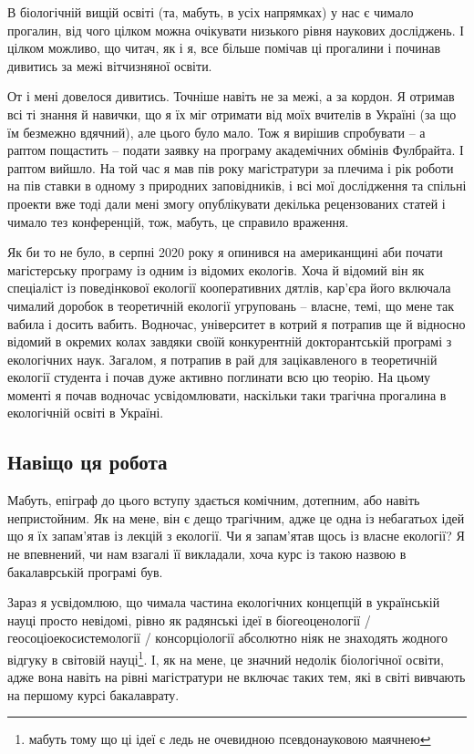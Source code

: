 \documentclass[
  11pt,
]{book}
\begin{document}
В біологічній вищій освіті (та, мабуть, в усіх напрямках) у нас є чимало прогалин, від чого цілком можна очікувати низького рівня наукових досліджень. І цілком можливо, що читач, як і я, все більше помічав ці прогалини і починав дивитись за межі вітчизняної освіти.

От і мені довелося дивитись. Точніше навіть не за межі, а за кордон. Я отримав всі ті знання й навички, що я їх міг отримати від моїх вчителів в Україні (за що їм безмежно вдячний), але цього було мало. Тож я вирішив спробувати -- а раптом пощастить -- подати заявку на програму академічних обмінів Фулбрайта. І раптом вийшло. На той час я мав пів року магістратури за плечима і рік роботи на пів ставки в одному з природних заповідників, і всі мої дослідження та спільні проекти вже тоді дали мені змогу опублікувати декілька рецензованих статей і чимало тез конференцій, тож, мабуть, це справило враження.

Як би то не було, в серпні 2020 року я опинився на американщині аби почати магістерську програму із одним із відомих екологів. Хоча й відомий він як спеціаліст із поведінкової екології кооперативних дятлів, кар'єра його включала чималий доробок в теоретичній екології угруповань -- власне, темі, що мене так вабила і досить вабить. Водночас, університет в котрий я потрапив ще й відносно відомий в окремих колах завдяки своїй конкурентній докторантській програмі з екологічних наук. Загалом, я потрапив в рай для зацікавленого в теоретичній екології студента і почав дуже активно поглинати всю цю теорію. На цьому моменті я почав водночас усвідомлювати, наскільки таки трагічна прогалина в екологічній освіті в Україні.

\subsection{Навіщо ця робота}\label{whythiswork}

Мабуть, епіграф до цього вступу здається комічним, дотепним, або навіть непристойним. Як на мене, він є дещо трагічним, адже це одна із небагатьох ідей що я їх запам'ятав із лекцій з екології. Чи я запам'ятав щось із власне екології? Я не впевнений, чи нам взагалі її викладали, хоча курс із такою назвою в бакалаврській програмі був.

Зараз я усвідомлюю, що чимала частина екологічних концепцій в українській науці просто невідомі, рівно як радянські ідеї в біогеоценології / геосоціоекосистемології / консорціології абсолютно ніяк не знаходять жодного відгуку в світовій науці\footnote{мабуть тому що ці ідеї є ледь не очевидною псевдонауковою маячнею}. І, як на мене, це значний недолік біологічної освіти, адже вона навіть на рівні магістратури не включає таких тем, які в світі вивчають на першому курсі бакалаврату.
\end{document}
